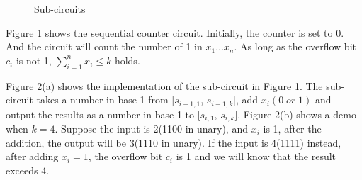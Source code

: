 \documentclass[11pt]{article}
\begin{document}
\begin{figure}[H]
    \centering
    \qquad
    \caption{Sub-circuits}%
\end{figure}

Figure 1 shows the sequential counter circuit. Initially, the counter is set to 0. And the circuit will count the number of 1 in $x_1\ldots x_n$. As long as the overflow bit $c_i$ is not 1, $\sum\limits_{i=1}^{n}x_i\leq k$ holds.

Figure 2(a) shows the implementation of the sub-circuit in Figure 1. The sub-circuit takes a number in base 1 from [$s_{i-1,1}$, $s_{i-1,k}$], add $x_i(0\;or\;1)$ and output the results as a number in base 1 to [$s_{i,1}$, $s_{i,k}$]. Figure 2(b) shows a demo when $k=4$. Suppose the input is 2(1100 in unary), and $x_i$ is 1, after the addition, the output will be 3(1110 in unary). If the input is 4(1111) instead, after adding $x_i=1$, the overflow bit $c_i$ is 1 and we will know that the result exceeds 4.
\end{document}

